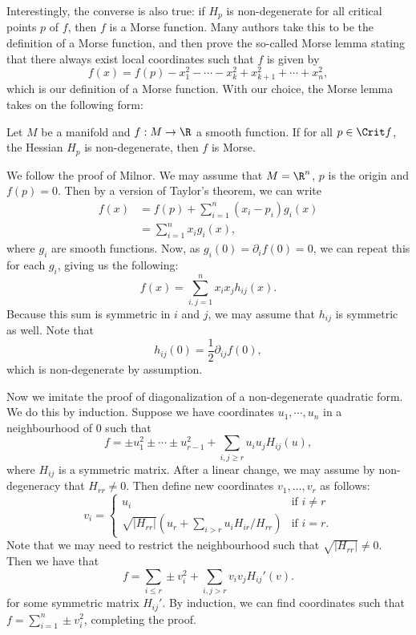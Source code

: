Interestingly, the converse is also true: if $H_p$ is non-degenerate for all critical points  $p$ of $f$, then  $f$ is a Morse function.
Many authors take this to be the definition of a Morse function, and then prove the so-called Morse lemma stating that there always exist local coordinates such that $f$ is given by
\[
    f(x) = f(p) - x_1^2 - \cdots - x_k^2 + x_{k+1}^2 + \cdots + x_n^2
,\] 
which is our definition of a Morse function. 
With our choice, the Morse lemma takes on the following form:
\begin{lemma}
    Let $M$ be a manifold and $f: M \to  \R$ a smooth function.
    If for all $p \in \Crit f$, the Hessian $H_p$ is non-degenerate, then $f$ is Morse.
\end{lemma}
\begin{myproof}
    We follow the proof of Milnor.
    We may assume that $M = \R^{n}$, $p$ is the origin and $f(p) = 0$.
    Then by a version of Taylor's theorem, we can write
    \begin{align*}
        f(x)  &= f(p) + \sum_{i=1}^{n} (x_i - p_i) g_i (x)\\
              &= \sum_{i=1}^{n} x_i g_i(x)
    ,\end{align*} 
    where $g_i$ are smooth functions. 
    Now, as $g_i(0) = \partial_i f (0) = 0$, we can repeat this for each  $g_i$, giving us the following:
    \[
        f(x) = \sum_{i, j= 1}^{n} x_i x_j h_{ij}(x)
    .\] 
    Because this sum is symmetric in $i$ and  $j$, we may assume that  $h_{ij}$ is symmetric as well.
    Note that
    \[
        h_{ij}(0) = \frac{1}{2} \partial_{ij} f(0)
    ,\]
    which is non-degenerate by assumption.

    Now we imitate the proof of diagonalization of a non-degenerate quadratic form.
    We do this by induction.
    Suppose we have coordinates $u_1, \cdots, u_n$ in a neighbourhood of $0$ such that
    \[
        f = \pm u_1^2 \pm \cdots \pm u_{r-1}^2 + \sum_{i,j\ge r} u_i u_j H_{ij}(u)
    ,\] 
    where $H_{ij}$ is a symmetric matrix.
    After a linear change, we may assume by non-degeneracy that $H_{rr} \neq 0$.
    Then define new coordinates $ v_1, \ldots, v_r$ as follows:
    \[
        v_i = \begin{cases}
            u_i & \text{if $i \neq r$}\\
            \sqrt{|H_{rr}|} (u_r + \sum_{i > r} u_i H_{ir} / H_{rr}) & \text{if $i = r$.}
        \end{cases}
    \] 
    Note that we may need to restrict the neighbourhood such that $\sqrt{|H_{rr}|} \neq 0$.
    Then we have that
    \[
        f = \sum_{i\le r} \pm v_i^2 + \sum_{i,j > r} v_i v_j H_{ij}'(v)
    .\] 
    for some symmetric matrix $H_{ij}'$.
    By induction, we can find coordinates such that
    $f = \sum_{i=1}^{n} \pm v_i^2$, completing the proof.
\end{myproof}

